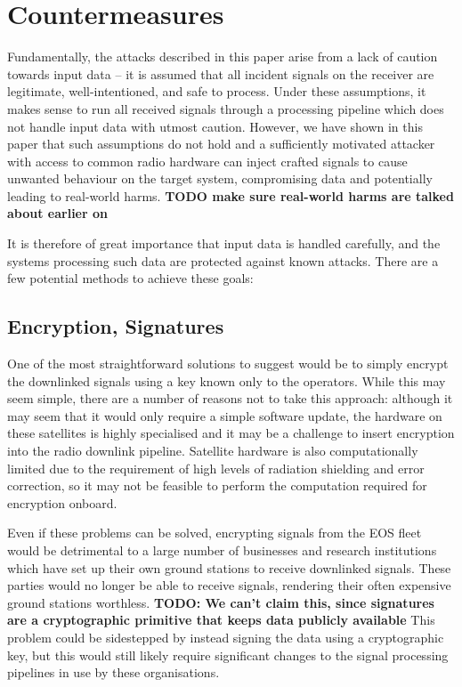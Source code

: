 \section{Countermeasures}

Fundamentally, the attacks described in this paper arise from a lack of caution towards input data -- it is assumed that all incident signals on the receiver are legitimate, well-intentioned, and safe to process.
Under these assumptions, it makes sense to run all received signals through a processing pipeline which does not handle input data with utmost caution.
However, we have shown in this paper that such assumptions do not hold and a sufficiently motivated attacker with access to common radio hardware can inject crafted signals to cause unwanted behaviour on the target system, compromising data and potentially leading to real-world harms.
\textbf{TODO make sure real-world harms are talked about earlier on}

It is therefore of great importance that input data is handled carefully, and the systems processing such data are protected against known attacks.
There are a few potential methods to achieve these goals:

\subsection{Encryption, Signatures}

One of the most straightforward solutions to suggest would be to simply encrypt the downlinked signals using a key known only to the operators.
While this may seem simple, there are a number of reasons not to take this approach: although it may seem that it would only require a simple software update, the hardware on these satellites is highly specialised and it may be a challenge to insert encryption into the radio downlink pipeline.
Satellite hardware is also computationally limited due to the requirement of high levels of radiation shielding and error correction, so it may not be feasible to perform the computation required for encryption onboard.

Even if these problems can be solved, encrypting signals from the EOS fleet would be detrimental to a large number of businesses and research institutions which have set up their own ground stations to receive downlinked signals.
These parties would no longer be able to receive signals, rendering their often expensive ground stations worthless. \textbf{TODO: We can't claim this, since signatures are a cryptographic primitive that keeps data publicly available}
This problem could be sidestepped by instead signing the data using a cryptographic key, but this would still likely require significant changes to the signal processing pipelines in use by these organisations.

